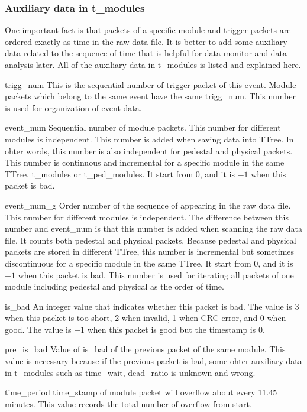 \documentclass[a4paper, 12pt, onecolumn]{article}
\begin{document}
\subsubsection{Auxiliary data in t\_modules}
One important fact is that packets of a specific module and trigger packets are ordered exactly as time in the raw data file.
It is better to add some auxiliary data related to the sequence of time that is helpful for data monitor and data analysis later.
All of the auxiliary data in t\_modules is listed and explained here.

\begin{asparadesc}
\item[trigg\_num] This is the sequential number of trigger packet of this event. Module packets which belong to the same event have the same trigg\_num.
  This number is used for organization of event data.
\item[event\_num] Sequential number of module packets. This number for different modules is independent. This number is added when saving data into TTree.
  In ohter words, this number is also independent for pedestal and physical packets.
  This number is continuous and incremental for a specific module in the same TTree, t\_modules or t\_ped\_modules.
  It start from 0, and it is $-1$ when this packet is bad.
\item[event\_num\_g] Order number of the sequence of appearing in the raw data file. This number for different modules is independent.
  The difference between this number and event\_num is that this number is added when scanning the raw data file. It counts both pedestal and physical packets.
  Because pedestal and physical packets are stored in different TTree, this number is incremental but sometimes discontinuous for a specific module in the same TTree.
  It start from 0, and it is $-1$ when this packet is bad. This number is used for iterating all packets of one module including pedestal and physical as the order of time.
\item[is\_bad] An integer value that indicates whether this packet is bad. The value is 3 when this packet is too short, 2 when invalid, 1 when CRC error, and 0 when good.
  The value is $-1$ when this packet is good but the timestamp is 0.
\item[pre\_is\_bad] Value of is\_bad of the previous packet of the same module.
  This value is necessary because if the previous packet is bad, some ohter auxiliary data in t\_modules such as time\_wait, dead\_ratio is unknown and wrong.
\item[time\_period] time\_stamp of module packet will overflow about every 11.45 minutes. This value records the total number of overflow from start.

\end{asparadesc}
\end{document}
